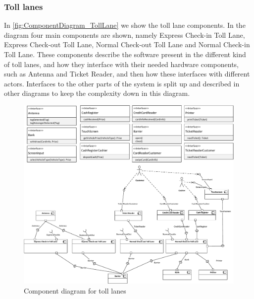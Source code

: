 \subsubsection*{Toll lanes}
In \autoref{fig:ComponentDiagram_TollLane} we show the toll lane components. In the diagram four main components are shown, namely Express Check-in Toll Lane, Express Check-out Toll Lane, Normal Check-out Toll Lane and Normal Check-in Toll Lane. These components describe the software present in the different kind of toll lanes, and how they interface with their needed hardware components, such as Antenna and Ticket Reader, and then how these interfaces with different actors. Interfaces to the other parts of the system is split up and described in other diagrams to keep the complexity down in this diagram.
\begin{figure}[H]
\centering
\includegraphics[width=1\textwidth]{img/component_diagrams/componentdiagram_tolllane}
\caption{Component diagram for toll lanes}
\label{fig:ComponentDiagram_TollLane}
\end{figure}